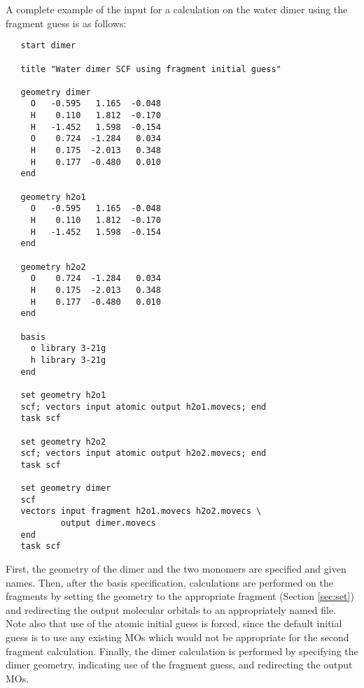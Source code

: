 A complete example of the input for a calculation on the water
dimer using the fragment guess is as follows:
\begin{verbatim}
   start dimer

   title "Water dimer SCF using fragment initial guess"

   geometry dimer
     O   -0.595   1.165  -0.048
     H    0.110   1.812  -0.170
     H   -1.452   1.598  -0.154
     O    0.724  -1.284   0.034
     H    0.175  -2.013   0.348
     H    0.177  -0.480   0.010
   end

   geometry h2o1
     O   -0.595   1.165  -0.048
     H    0.110   1.812  -0.170
     H   -1.452   1.598  -0.154
   end

   geometry h2o2
     O    0.724  -1.284   0.034
     H    0.175  -2.013   0.348
     H    0.177  -0.480   0.010
   end

   basis
     o library 3-21g
     h library 3-21g
   end

   set geometry h2o1
   scf; vectors input atomic output h2o1.movecs; end
   task scf

   set geometry h2o2
   scf; vectors input atomic output h2o2.movecs; end
   task scf

   set geometry dimer
   scf
   vectors input fragment h2o1.movecs h2o2.movecs \
           output dimer.movecs
   end
   task scf
\end{verbatim}
First, the geometry of the dimer and the two monomers are specified
and given names.  Then, after the basis specification, calculations
are performed on the fragments by setting the geometry to the
appropriate fragment (Section \ref{sec:set}) and redirecting the
output molecular orbitals to an appropriately named file.  Note also
that use of the atomic initial guess is forced, since the default
initial guess is to use any existing MOs which would not be
appropriate for the second fragment calculation.  Finally, the dimer
calculation is performed by specifying the dimer geometry, indicating
use of the fragment guess, and redirecting the output MOs.

